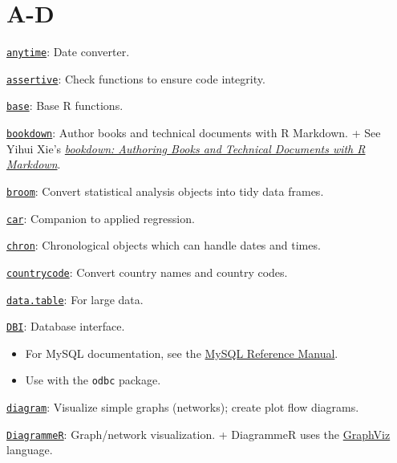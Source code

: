 \documentclass[]{book}
\begin{document}
\hypertarget{a-d}{%
\section{A-D}\label{a-d}}

\href{https://CRAN.R-project.org/package=anytime}{\texttt{anytime}}: Date converter.

\href{https://CRAN.R-project.org/package=assertive}{\texttt{assertive}}: Check functions to ensure code integrity.

\href{https://www.rdocumentation.org/packages/base/versions/3.5.1}{\texttt{base}}: Base R functions.

\href{https://CRAN.R-project.org/package=bookdown}{\texttt{bookdown}}: Author books and technical documents with R Markdown.
+ See Yihui Xie's \href{https://bookdown.org/yihui/bookdown/}{\emph{bookdown: Authoring Books and Technical Documents with R Markdown}}.

\href{https://CRAN.R-project.org/package=broom}{\texttt{broom}}: Convert statistical analysis objects into tidy data frames.

\href{https://CRAN.R-project.org/package=car}{\texttt{car}}: Companion to applied regression.

\href{https://CRAN.R-project.org/package=chron}{\texttt{chron}}: Chronological objects which can handle dates and times.

\href{https://CRAN.R-project.org/package=countrycode}{\texttt{countrycode}}: Convert country names and country codes.

\href{https://CRAN.R-project.org/package=data.table}{\texttt{data.table}}: For large data.

\href{https://CRAN.R-project.org/package=DBI}{\texttt{DBI}}: Database interface.

\begin{itemize}
\item
  For MySQL documentation, see the \href{https://dev.mysql.com/}{MySQL Reference Manual}.
\item
  Use with the \texttt{odbc} package.
\end{itemize}

\href{https://CRAN.R-project.org/package=diagram}{\texttt{diagram}}: Visualize simple graphs (networks); create plot flow diagrams.

\href{https://CRAN.R-project.org/package=DiagrammeR}{\texttt{DiagrammeR}}: Graph/network visualization.
+ DiagrammeR uses the \href{https://www.graphviz.org/}{GraphViz} language.
\end{document}
